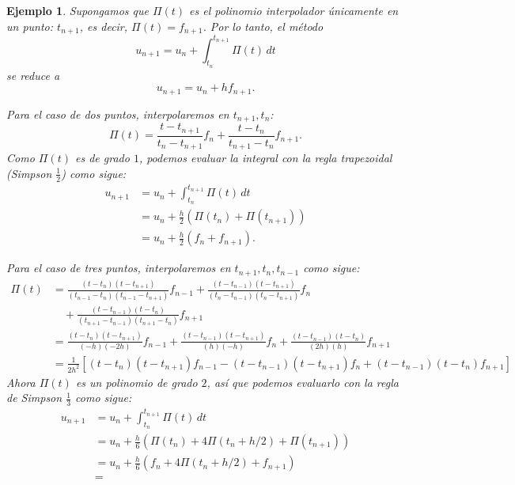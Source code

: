 \documentclass[11pt,letterpaper]{article}
\newtheorem{example}{Ejemplo}
\begin{document}
\begin{example}
  Supongamos que $\Pi(t)$ es el polinomio interpolador únicamente en
  un punto: $t_{n+1}$, es decir, $\Pi(t)=f_{n+1}$.
  Por lo tanto, el método
  \begin{equation}
    u_{n+1} = u_n + \int_{t_n}^{t_{n+1}} \Pi(t) \,dt
  \end{equation}
  se reduce a
  \begin{equation}
    u_{n+1} = u_n + hf_{n+1}.
  \end{equation}

  Para el caso de dos puntos, interpolaremos en $t_{n+1},t_n$:
   \begin{equation}
    \Pi(t)
    = \frac{t-t_{n+1}}{t_{n}-t_{n+1}}f_n
    + \frac{t-t_n}{t_{n+1}-t_n}f_{n+1}
  .\end{equation}
  Como $\Pi(t)$ es de grado $1$, podemos evaluar la integral con la
  regla trapezoidal (Simpson $\frac{1}{2}$) como sigue:
  \begin{align}
    u_{n+1}
    &= u_n + \int_{t_n}^{t_{n+1}} \Pi(t) \,dt \\
    &= u_{n} + \frac{h}{2}(\Pi(t_{n})+\Pi(t_{n+1})) \\
    &= u_{n} + \frac{h}{2}(f_{n}+f_{n+1}).
  \end{align}

  Para el caso de tres puntos, interpolaremos en $t_{n+1},t_n,t_{n-1}$ 
  como sigue:
  \begin{equation}
    \begin{split}
      \Pi(t)
      &=
      \frac{(t-t_{n})(t-t_{n+1})}{(t_{n-1}-t_n)(t_{n-1}-t_{n+1})}
      f_{n-1}
      +
      \frac{(t-t_{n-1})(t-t_{n+1})}{(t_{n}-t_{n-1})(t_{n}-t_{n+1})}
      f_{n}
      \\
      &\quad +
      \frac{(t-t_{n-1})(t-t_{n})}{(t_{n+1}-t_{n-1})(t_{n+1}-t_{n})}
      f_{n+1}
      \\
      &=
      \frac{(t-t_{n})(t-t_{n+1})}{(-h)(-2h)}
      f_{n-1}
      +
      \frac{(t-t_{n-1})(t-t_{n+1})}{(h)(-h)}
      f_{n}
      +
      \frac{(t-t_{n-1})(t-t_{n})}{(2h)(h)}
      f_{n+1}
      \\
      &=
      \frac{1}{2h^{2}}
      \left[
        (t-t_{n})(t-t_{n+1}) f_{n-1}
        - (t-t_{n-1})(t-t_{n+1}) f_{n}
        + (t-t_{n-1})(t-t_{n}) f_{n+1}
      \right]
    \end{split}
  \end{equation}
  Ahora $\Pi(t)$ es un polinomio de grado $2$, así que podemos
  evaluarlo con la regla de Simpson $\frac{1}{3}$ como sigue:
  \begin{align}
    u_{n+1}
    &= u_n + \int_{t_n}^{t_{n+1}} \Pi(t) \,dt \\
    &= u_{n}
    + \frac{h}{6}(\Pi(t_{n})+4\Pi(t_n + h / 2)+\Pi(t_{n+1})) \\
    &= u_{n}
    + \frac{h}{6}(f_{n}+4\Pi(t_n + h / 2)+f_{n+1}) \\
    &= 
  \end{align}
\end{example}
\end{document}
